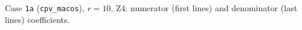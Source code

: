 \begin{table}[H]
$$ $$\normalsize \caption{Case \texttt{1a} (\texttt{cpv_macos}), $r=10$, Z4: numerator (first lines) and denominator (last lines) coefficients.} \label{tab:sym-1a-r10} \end{table}